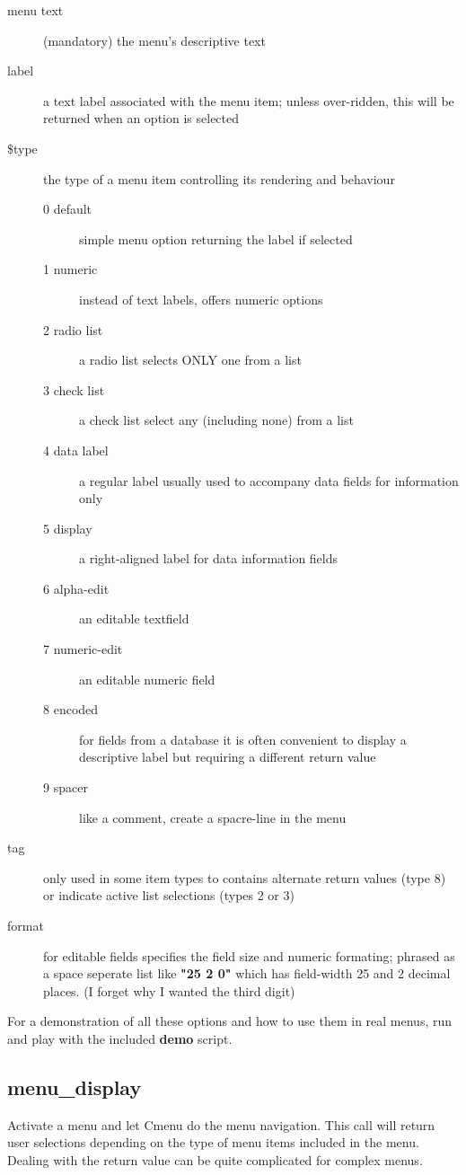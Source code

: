 \documentclass[a4paper]{scrartcl}
\begin{document}
\begin{description}
\item [menu text] (mandatory) the menu's descriptive text
\item [label] a text label associated with the menu item; unless over-ridden, this will be returned when an option is selected
\item [\$type] the type of a menu item controlling its rendering and behaviour
\begin{description}
\item [0 default] simple menu option returning the label if selected
\item [1 numeric] instead of text labels, offers numeric options
\item [2 radio list] a radio list selects ONLY one from a list
\item [3 check list] a check list select any (including none) from a list
\item [4 data label] a regular label usually used to accompany data fields for information only
\item [5 display] a right-aligned label for data information fields
\item [6 alpha-edit] an editable textfield
\item [7 numeric-edit] an editable numeric field
\item [8 encoded] for fields from a database it is often convenient to display a descriptive label but requiring a different return value
\item [9 spacer] like a comment, create a spacre-line in the menu
\end{description}
\item [tag] only used in some item types to contains alternate return values (type 8) or indicate active list selections (types 2 or 3)
\item [format] for editable fields specifies the field size and numeric formating; phrased as a space seperate list like \textbf{"25 2 0"} which has field-width 25 and 2 decimal places. (I forget why I wanted the third digit)
\end{description}

For a demonstration of all these options and how to use them in real menus, run and play with the included \textbf{demo} script.

\subsection{menu\_display} 
Activate a menu and let Cmenu do the menu navigation. This call will return user selections depending on the type of menu items included in the menu. Dealing with the return value can be quite complicated for complex menus.
\end{document}
